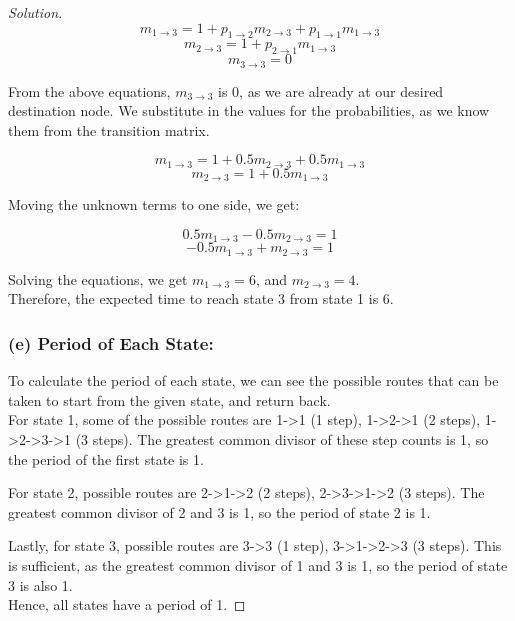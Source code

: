 \documentclass[12pt]{article}
\newenvironment{solution}{\begin{proof}[Solution]}{\end{proof}}
\begin{document}
\begin{solution}
\[
m_{1\rightarrow3} = 1 + p_{1\rightarrow2}m_{2\rightarrow3} + p_{1\rightarrow1}m_{1\rightarrow3}
\]
\[
m_{2\rightarrow3} = 1 + p_{2\rightarrow1}m_{1\rightarrow3}
\]
\[
m_{3\rightarrow3} = 0
\]

From the above equations, $m_{3\rightarrow3}$ is 0, as we are already at our desired destination node. We substitute in the values for the probabilities, as we know them from the transition matrix.

\[
m_{1\rightarrow3} = 1 + 0.5m_{2\rightarrow3} + 0.5m_{1\rightarrow3}
\]
\[
m_{2\rightarrow3} = 1 + 0.5m_{1\rightarrow3}
\]

Moving the unknown terms to one side, we get:

\[
0.5m_{1\rightarrow3} - 0.5m_{2\rightarrow3} = 1
\]
\[
-0.5m_{1\rightarrow3} + m_{2\rightarrow3} = 1 
\]

Solving the equations, we get $m_{1\rightarrow3} = 6$, and $m_{2\rightarrow3} = 4$. \\

Therefore, the expected time to reach state 3 from state 1 is 6.

\subsubsection*{(e) Period of Each State:}
To calculate the period of each state, we can see the possible routes that can be taken to start from the given state, and return back. \\

For state 1, some of the possible routes are 1->1 (1 step), 1->2->1 (2 steps), 1->2->3->1 (3 steps). The greatest common divisor of these step counts is 1, so the period of the first state is 1.

For state 2, possible routes are 2->1->2 (2 steps), 2->3->1->2 (3 steps). The greatest common divisor of 2 and 3 is 1, so the period of state 2 is 1.

Lastly, for state 3, possible routes are 3->3 (1 step), 3->1->2->3 (3 steps). This is sufficient, as the greatest common divisor of 1 and 3 is 1, so the period of state 3 is also 1. \\

Hence, all states have a period of 1.
\end{solution}

\newpage
\end{document}
